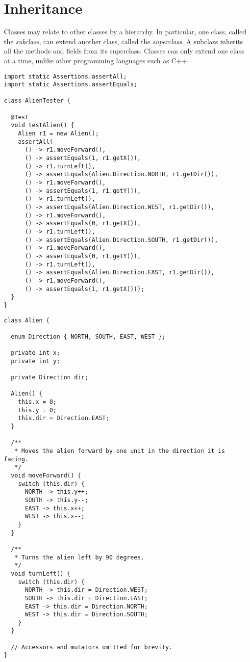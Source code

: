 \section{Inheritance}

Classes may relate to other classes by a hierarchy. In particular, one class, called the \emph{subclass}, can extend another class, called the \emph{superclass}. A subclass inherits all the methods and fields from its superclass. Classes can only extend one class at a time, unlike other programming languages such as C++. 



\begin{lstlisting}[language=MyJava]
import static Assertions.assertAll;
import static Assertions.assertEquals;

class AlienTester {

  @Test
  void testAlien() {
    Alien r1 = new Alien();
    assertAll(
      () -> r1.moveForward(),
      () -> assertEquals(1, r1.getX()),
      () -> r1.turnLeft(),
      () -> assertEquals(Alien.Direction.NORTH, r1.getDir()),
      () -> r1.moveForward(),
      () -> assertEquals(1, r1.getY()),
      () -> r1.turnLeft(),
      () -> assertEquals(Alien.Direction.WEST, r1.getDir()),
      () -> r1.moveForward(),
      () -> assertEquals(0, r1.getX()),
      () -> r1.turnLeft(),
      () -> assertEquals(Alien.Direction.SOUTH, r1.getDir()),
      () -> r1.moveForward(),
      () -> assertEquals(0, r1.getY()),
      () -> r1.turnLeft(),
      () -> assertEquals(Alien.Direction.EAST, r1.getDir()),
      () -> r1.moveForward(),
      () -> assertEquals(1, r1.getX()));
  }
}
\end{lstlisting}

\begin{lstlisting}[language=MyJava]
class Alien {

  enum Direction { NORTH, SOUTH, EAST, WEST };

  private int x;
  private int y;

  private Direction dir;

  Alien() {
    this.x = 0;
    this.y = 0;
    this.dir = Direction.EAST;
  }

  /**
   * Moves the alien forward by one unit in the direction it is facing.
   */
  void moveForward() {
    switch (this.dir) {
      NORTH -> this.y++;
      SOUTH -> this.y--;
      EAST -> this.x++;
      WEST -> this.x--;
    }
  }

  /**
   * Turns the alien left by 90 degrees.
   */
  void turnLeft() {
    switch (this.dir) {
      NORTH -> this.dir = Direction.WEST;
      SOUTH -> this.dir = Direction.EAST;
      EAST -> this.dir = Direction.NORTH;
      WEST -> this.dir = Direction.SOUTH;
    }
  }

  // Accessors and mutators omitted for brevity.
}
\end{lstlisting}


